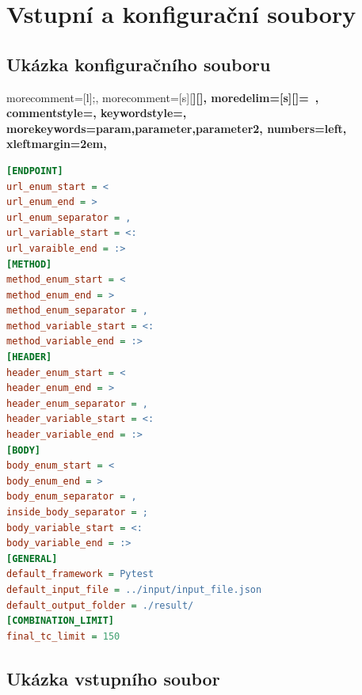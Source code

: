 \chapter{Vstupní a konfigurační soubory}
\label{chap_VstupAplikace}


\section*{Ukázka konfiguračního souboru}
\label{chap_ConfigFile}


{
  morecomment=[l]{;},
  morecomment=[s][\color{darkblue}\bfseries]{[}{]},
  moredelim=[s][\color{darkbrown}]{=}{\ },
  commentstyle=\color{darkgreen},
  keywordstyle={\color{maroon}\bfseries},
  morekeywords={param,parameter,parameter2},
  numbers=left,
  xleftmargin=2em,
}

\begin{lstlisting}[language={INI}, frame=single]
[ENDPOINT]
url_enum_start = <
url_enum_end = >
url_enum_separator = ,
url_variable_start = <:
url_varaible_end = :>
[METHOD]
method_enum_start = <
method_enum_end = >
method_enum_separator = ,
method_variable_start = <:
method_variable_end = :>
[HEADER]
header_enum_start = <
header_enum_end = >
header_enum_separator = ,
header_variable_start = <:
header_variable_end = :>
[BODY]
body_enum_start = <
body_enum_end = >
body_enum_separator = ,
inside_body_separator = ;
body_variable_start = <:
body_variable_end = :>
[GENERAL]
default_framework = Pytest
default_input_file = ../input/input_file.json
default_output_folder = ./result/
[COMBINATION_LIMIT]
final_tc_limit = 150
\end{lstlisting}


\section*{Ukázka vstupního soubor}




